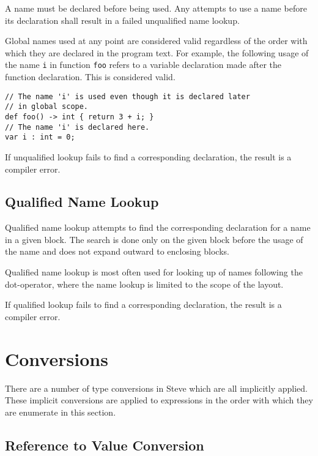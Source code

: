 A name must be declared before being used. Any attempts to use a name before its declaration shall result in a failed unqualified name lookup.

Global names used at any point are considered valid regardless of the order with which they are declared in the program text. For example, the following usage of the name \texttt{i} in function \texttt{foo} refers to a variable declaration made after the function declaration. This is considered valid.

\begin{minip}
\begin{lstlisting}
// The name 'i' is used even though it is declared later
// in global scope.
def foo() -> int { return 3 + i; }
// The name 'i' is declared here.
var i : int = 0;
\end{lstlisting}
\end{minip}

If unqualified lookup fails to find a corresponding declaration, the result is a compiler error.

\subsection{Qualified Name Lookup} \label{qlfd_lookup}

Qualified name lookup attempts to find the corresponding declaration for a name in a given block. The search is done only on the given block before the usage of the name and does not expand outward to enclosing blocks.

Qualified name lookup is most often used for looking up of names following the dot-operator, where the name lookup is limited to the scope of the layout.

If qualified lookup fails to find a corresponding declaration, the result is a compiler error.

\section{Conversions} \label{conversions_guide}

There are a number of type conversions in Steve which are all implicitly applied. These implicit conversions are applied to expressions in the order with which they are enumerate in this section.

\subsection{Reference to Value Conversion} \label{reftoval_conv}

